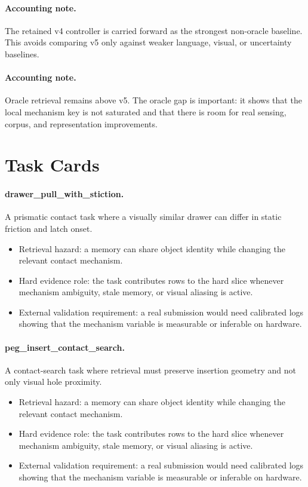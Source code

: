\documentclass{article}
\begin{document}
\paragraph{Accounting note.} The retained v4 controller is carried forward as the strongest non-oracle baseline. This avoids comparing v5 only against weaker language, visual, or uncertainty baselines.
\paragraph{Accounting note.} Oracle retrieval remains above v5. The oracle gap is important: it shows that the local mechanism key is not saturated and that there is room for real sensing, corpus, and representation improvements.
\section{Task Cards}
\paragraph{drawer\_pull\_with\_stiction.} A prismatic contact task where a visually similar drawer can differ in static friction and latch onset.
\begin{itemize}
\item Retrieval hazard: a memory can share object identity while changing the relevant contact mechanism.
\item Hard evidence role: the task contributes rows to the hard slice whenever mechanism ambiguity, stale memory, or visual aliasing is active.
\item External validation requirement: a real submission would need calibrated logs showing that the mechanism variable is measurable or inferable on hardware.
\end{itemize}
\paragraph{peg\_insert\_contact\_search.} A contact-search task where retrieval must preserve insertion geometry and not only visual hole proximity.
\begin{itemize}
\item Retrieval hazard: a memory can share object identity while changing the relevant contact mechanism.
\item Hard evidence role: the task contributes rows to the hard slice whenever mechanism ambiguity, stale memory, or visual aliasing is active.
\item External validation requirement: a real submission would need calibrated logs showing that the mechanism variable is measurable or inferable on hardware.
\end{itemize}
\end{document}
